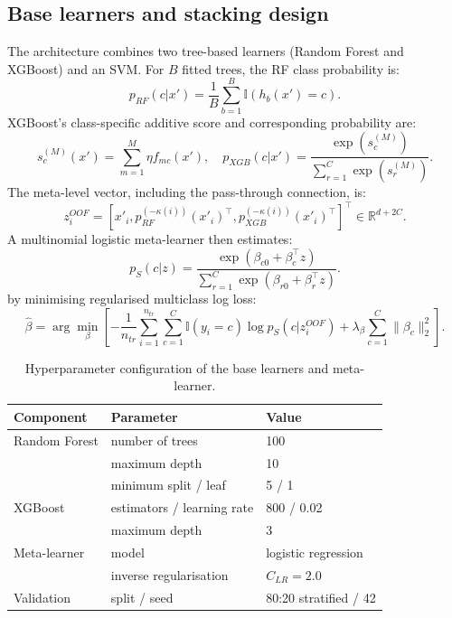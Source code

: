 \documentclass{turkjour}%
\begin{document}
\subsection{Base learners and stacking design}
The architecture combines two tree-based learners (Random Forest and XGBoost) and an SVM. For $B$ fitted trees, the RF class probability is:
\begin{equation}
p_{RF}(c|x') = \frac{1}{B} \sum_{b=1}^B \mathbb{I}(h_b(x') = c).
\end{equation}
XGBoost's class-specific additive score and corresponding probability are:
\begin{equation}
s_c^{(M)}(x') = \sum_{m=1}^M \eta f_{mc}(x'), \quad p_{XGB}(c|x') = \frac{\exp(s_c^{(M)})}{\sum_{r=1}^C \exp(s_r^{(M)})}.
\end{equation}
The meta-level vector, including the pass-through connection, is:
\begin{equation}
z^{OOF}_i = \left[x'_i, p_{RF}^{(-\kappa(i))}(x'_i)^\top, p_{XGB}^{(-\kappa(i))}(x'_i)^\top\right]^\top \in \mathbb{R}^{d+2C}.
\end{equation}
A multinomial logistic meta-learner then estimates:
\begin{equation}
p_S(c|z) = \frac{\exp(\beta_{c0} + \beta_c^\top z)}{\sum_{r=1}^C \exp(\beta_{r0} + \beta_r^\top z)}.
\end{equation}
by minimising regularised multiclass log loss:
\begin{equation}
\hat{\beta} = \arg \min_{\beta} \left[ -\frac{1}{n_{tr}} \sum_{i=1}^{n_{tr}} \sum_{c=1}^C \mathbb{I}(y_i = c) \log p_S(c|z_i^{OOF}) + \lambda_\beta \sum_{c=1}^C \|\beta_c\|_2^2 \right].
\end{equation}

\begin{table}[htbp]
\centering
\caption{Hyperparameter configuration of the base learners and meta-learner.}
\label{tab:hyperparameters}
\begin{tabular}{lll}
\toprule
\textbf{Component} & \textbf{Parameter} & \textbf{Value} \\
\midrule
Random Forest & number of trees & 100 \\
 & maximum depth & 10 \\
 & minimum split / leaf & 5 / 1 \\
XGBoost & estimators / learning rate & 800 / 0.02 \\
 & maximum depth & 3 \\
Meta-learner & model & logistic regression \\
 & inverse regularisation & $C_{LR} = 2.0$ \\
Validation & split / seed & 80:20 stratified / 42 \\
\bottomrule
\end{tabular}
\end{table}
\end{document}
